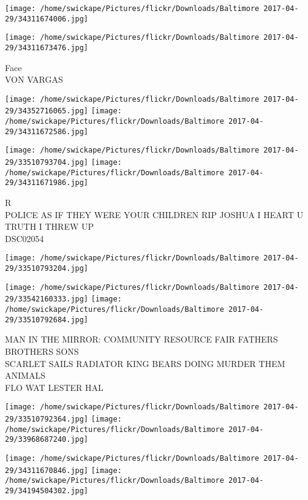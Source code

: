 \documentclass[10pt,letterpaper]{article}
\begin{document}
\texttt{[image: /home/swickape/Pictures/flickr/Downloads/Baltimore 2017-04-29/34311674006.jpg]}

\vspace{0.25in}
\texttt{[image: /home/swickape/Pictures/flickr/Downloads/Baltimore 2017-04-29/34311673476.jpg]}

Face\\
VON VARGAS\\
\pagebreak

\texttt{[image: /home/swickape/Pictures/flickr/Downloads/Baltimore 2017-04-29/34352716065.jpg]}
\texttt{[image: /home/swickape/Pictures/flickr/Downloads/Baltimore 2017-04-29/34311672586.jpg]}

\texttt{[image: /home/swickape/Pictures/flickr/Downloads/Baltimore 2017-04-29/33510793704.jpg]}
\texttt{[image: /home/swickape/Pictures/flickr/Downloads/Baltimore 2017-04-29/34311671986.jpg]}

R\\
POLICE AS IF THEY WERE YOUR CHILDREN RIP JOSHUA I HEART U\\
TRUTH I THREW UP\\
DSC02054\\
\pagebreak

\texttt{[image: /home/swickape/Pictures/flickr/Downloads/Baltimore 2017-04-29/33510793204.jpg]}

\vspace{0.25in}
\texttt{[image: /home/swickape/Pictures/flickr/Downloads/Baltimore 2017-04-29/33542160333.jpg]}
\texttt{[image: /home/swickape/Pictures/flickr/Downloads/Baltimore 2017-04-29/33510792684.jpg]}

MAN IN THE MIRROR: COMMUNITY RESOURCE FAIR FATHERS BROTHERS SONS\\
SCARLET SAILS RADIATOR KING BEARS DOING MURDER THEM ANIMALS\\
FLO WAT LESTER HAL\\
\pagebreak

\texttt{[image: /home/swickape/Pictures/flickr/Downloads/Baltimore 2017-04-29/33510792364.jpg]}
\texttt{[image: /home/swickape/Pictures/flickr/Downloads/Baltimore 2017-04-29/33968687240.jpg]}

\texttt{[image: /home/swickape/Pictures/flickr/Downloads/Baltimore 2017-04-29/34311670846.jpg]}
\texttt{[image: /home/swickape/Pictures/flickr/Downloads/Baltimore 2017-04-29/34194504302.jpg]}
\end{document}
